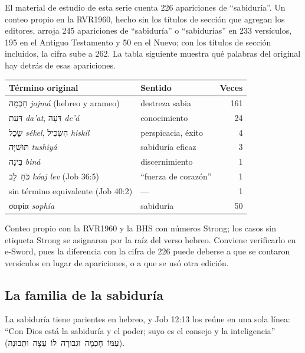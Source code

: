 \documentclass[11pt,letterpaper]{article}
\newcommand{\heb}[1]{\mbox{\foreignlanguage{hebrew}{#1}}}
\newcommand{\grc}[1]{\foreignlanguage{ancientgreek}{#1}}
\begin{document}
El material de estudio de esta serie cuenta 226 apariciones de ``sabiduría''. Un conteo propio en la RVR1960, hecho sin los títulos de sección que agregan los editores, arroja 245 apariciones de ``sabiduría'' o ``sabidurías'' en 233 versículos, 195 en el Antiguo Testamento y 50 en el Nuevo; con los títulos de sección incluidos, la cifra sube a 262. La tabla siguiente muestra qué palabras del original hay detrás de esas apariciones.

\begin{center}\small\renewcommand{\arraystretch}{1.2}
\begin{tabular}{@{}L{5.6cm}L{5.2cm}r@{}}
\toprule
\textbf{Término original} & \textbf{Sentido} & \textbf{Veces} \\ \midrule
\heb{חָכְמָה} \emph{jojmá} (hebreo y arameo) & destreza sabia & 161 \\
\heb{דַּעַת} \emph{da'at}, \heb{דֵּעָה} \emph{de'á} & conocimiento & 24 \\
\heb{שֵׂכֶל} \emph{sékel}, \heb{הִשְׂכִּיל} \emph{hiskil} & perspicacia, éxito & 4 \\
\heb{תּוּשִׁיָּה} \emph{tushiyá} & sabiduría eficaz & 3 \\
\heb{בִּינָה} \emph{biná} & discernimiento & 1 \\
\heb{כֹּחַ לֵב} \emph{kóaj lev} (Job 36:5) & ``fuerza de corazón'' & 1 \\
sin término equivalente (Job 40:2) & --- & 1 \\
\grc{σοφία} \emph{sophía} & sabiduría & 50 \\
\bottomrule
\end{tabular}\end{center}

\begin{nota}[Precisión]
Conteo propio con la RVR1960 y la BHS con números Strong; los casos sin etiqueta Strong se asignaron por la raíz del verso hebreo. Conviene verificarlo en e-Sword, pues la diferencia con la cifra de 226 puede deberse a que se contaron versículos en lugar de apariciones, o a que se usó otra edición.
\end{nota}

\subsection{La familia de la sabiduría}

La sabiduría tiene parientes en hebreo, y Job 12:13 los reúne en una sola línea: ``Con Dios está la sabiduría y el poder; suyo es el consejo y la inteligencia'' (\heb{עִמּוֹ חָכְמָה וּגְבוּרָה לוֹ עֵצָה וּתְבוּנָה}).
\end{document}
